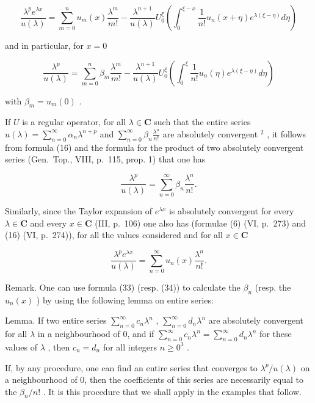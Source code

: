 \[
\frac {\lambda^ {p} e ^ {\lambda x}}{u (\lambda)} = \sum_ {m = 0} ^ {n} u _ {m} (x) \frac {\lambda^ {m}}{m !} - \frac {\lambda^ {n + 1}}{u (\lambda)} U _ {0} ^ {\xi} \left(\int_ {0} ^ {\xi - x} \frac {1}{n !} u _ {n} (x + \eta) e ^ {\lambda (\xi - \eta)} d \eta\right)\tag{31}
\]

and in particular, for \(x = 0\)

\[
\frac {\lambda^ {p}}{u (\lambda)} = \sum_ {m = 0} ^ {n} \beta_ {m} \frac {\lambda^ {m}}{m !} - \frac {\lambda^ {n + 1}}{u (\lambda)} U _ {0} ^ {\xi} \left(\int_ {0} ^ {\xi} \frac {1}{n !} u _ {n} (\eta) e ^ {\lambda (\xi - \eta)} d \eta\right)\tag{32}
\]

with \(\beta_{m} = u_{m}(0)\) .

If \(U\) is a regular operator, for all \(\lambda \in \mathbf{C}\) such that the entire series \(u(\lambda) = \sum_{n=0}^{\infty} \alpha_n \lambda^{n+p}\) and \(\sum_{n=0}^{\infty} \beta_n \frac{\lambda^n}{n!}\) are absolutely convergent \(^2\) , it follows from formula (16) and the formula for the product of two absolutely convergent series (Gen.~Top., VIII, p.~115, prop. 1) that one has

\[
{\frac {\lambda^ {p}}{u (\lambda)}} = \sum_ {n = 0} ^ {\infty} \beta_ {n} {\frac {\lambda^ {n}}{n !}}.\tag{33}
\]

Similarly, since the Taylor expansion of \(e^{\lambda x}\) is absolutely convergent for every \(\lambda \in \mathbf{C}\) and every \(x \in \mathbf{C}\) (III, p.~106) one also has (formulae (6) (VI, p.~273) and (16) (VI, p.~274)), for all the values considered and for all \(x \in \mathbf{C}\)

\[
\frac {\lambda^ {p} e ^ {\lambda x}}{u (\lambda)} = \sum_ {n = 0} ^ {\infty} u _ {n} (x) \frac {\lambda^ {n}}{n !}.\tag{34}
\]

Remark. One can use formula (33) (resp. (34)) to calculate the \(\beta_{n}\) (resp. the \(u_{n}(x)\) ) by using the following lemma on entire series:

Lemma. If two entire series \(\sum_{n=0}^{\infty} c_n \lambda^n\) , \(\sum_{n=0}^{\infty} d_n \lambda^n\) are absolutely convergent for all \(\lambda\) in a neighbourhood of 0, and if \(\sum_{n=0}^{\infty} c_n \lambda^n = \sum_{n=0}^{\infty} d_n \lambda^n\) for these values of \(\lambda\) , then \(c_n = d_n\) for all integers \(n \geqslant 0^3\) .

If, by any procedure, one can find an entire series that converges to \(\lambda^p / u(\lambda)\) on a neighbourhood of 0, then the coefficients of this series are necessarily equal to the \(\beta_n / n!\) . It is this procedure that we shall apply in the examples that follow.

